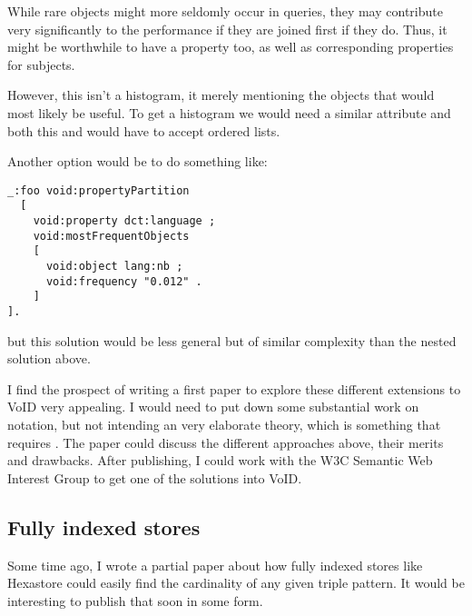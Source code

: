 While rare objects might more seldomly occur in queries, they may
contribute very significantly to the performance if they are joined
first if they do. Thus, it might be worthwhile to have a property
 too, as well as corresponding
properties for subjects.


However, this isn't a histogram, it merely mentioning the objects that
would most likely be useful. To get a histogram we would need a
similar  attribute and both this and
 would have to accept ordered
lists. 

Another option would be to do something like:
\begin{verbatim}
_:foo void:propertyPartition 
  [
    void:property dct:language ;
    void:mostFrequentObjects 
    [
      void:object lang:nb ;
      void:frequency "0.012" .
    ]
].
\end{verbatim}
but this solution would be less general but of similar complexity than
the nested solution above.

I find the prospect of writing a first paper to explore these different
extensions to VoID very appealing. I would need to put down some
substantial work on notation, but not intending an very elaborate
theory, which is something that requires \SRL. The paper could discuss
the different approaches above, their merits and drawbacks. After
publishing, I could work with the W3C Semantic Web Interest Group to
get one of the solutions into VoID.



\subsection{Fully indexed stores}

Some time ago, I wrote a partial paper about how fully indexed stores
like Hexastore \cite{hexastore} could easily find the cardinality of
any given triple pattern. It would be interesting to publish that soon
in some form.
